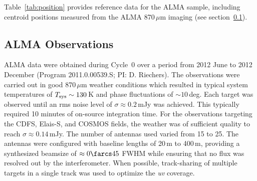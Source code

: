 \documentclass[iop]{emulateapj}
\begin{document}

Table~\ref{tab:position} provides reference data for the ALMA sample, including
centroid positions measured from the ALMA 870$\, \mu$m imaging (see
section~\ref{sec:almaobs}).

\subsection{ALMA Observations}\label{sec:almaobs}

ALMA data were obtained during Cycle~0 over a period from 2012 June to 2012
December (Program 2011.0.00539.S; PI: D. Riechers).  The observations were
carried out in good 870$\,\mu$m weather conditions which resulted in typical
system temperatures of $T_{\rm sys} \sim 130\,$K and phase fluctuations of $\sim
10\,$deg.  Each target was observed until an rms noise level of $\sigma \approx
0.2\,$mJy was achieved.  This typically required 10 minutes of on-source
integration time.  For the observations targeting the CDFS, Elais-S, and COSMOS
fields, the weather was of sufficient quality to reach $\sigma \approx
0.14\,$mJy.  The number of antennas used varied from 15 to 25.  The antennas
were configured with baseline lengths of 20$\,$m to 400$\,$m, providing a
synthesized beamsize of $\approx 0\farcs45$ FWHM while ensuring that no flux was
resolved out by the interferometer.  When possible, track-sharing of multiple
targets in a single track was used to optimize the {\it uv} coverage.
\end{document}
